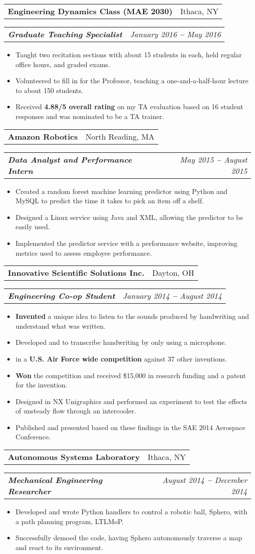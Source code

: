 \documentclass[letterpaper,11pt]{article}
\makeatletter
\def\vspaceAfterBullets{3pt} %
\def\bulletIndent{15pt} %
\newcommand{\bulletItem}[1]{
  \item\small{
    {#1}
  }
}
\newcommand{\companyNameAndLocationHeading}[2]{
  \item 
    \begin{tabular*}{1.0\textwidth}[b]{l@{\extracolsep{\fill}}r}
      \textbf{#1} & #2
    \end{tabular*}
}
\newcommand{\titleAndDateHeading}[2]{
    \item
    \begin{tabular*}{1.0\textwidth}[b]{l@{\extracolsep{\fill}}r}
      \textit{\textbf{\small#1}} & \textit{\small #2}
    \end{tabular*}
}
\newcommand{\outerBulletListStart}{\begin{itemize}[leftmargin=\bulletIndent]}
\newcommand{\outerBulletListEnd}{\end{itemize}\vspace{\vspaceAfterBullets}}
\newcommand{\bref}[2]{\href{#1}{\color{blue}{#2}}}
\makeatother
\begin{document}
\companyNameAndLocationHeading
{Engineering Dynamics Class (MAE 2030)}{Ithaca, NY}
\titleAndDateHeading
{Graduate Teaching Specialist}{January 2016 \textbf{--} May 2016}
\outerBulletListStart
\bulletItem{Taught two recitation sections with about 15 students in each, held regular office hours, and graded exams.}
\bulletItem{Volunteered to fill in for the Professor, teaching a one-and-a-half-hour lecture to about 150 students.}
\bulletItem{Received \textbf{4.88/5 overall rating} on my TA evaluation based on 16 student responses and was nominated to be a TA trainer.}
\outerBulletListEnd

\companyNameAndLocationHeading
{Amazon Robotics}{North Reading, MA}
\titleAndDateHeading
{Data Analyst and Performance Intern}{May 2015 \textbf{--} August 2015}
\outerBulletListStart
\bulletItem{Created a random forest machine learning predictor using Python and MySQL to predict the time it takes to pick an item off a shelf.}
\bulletItem{Designed a Linux service using Java and XML, allowing the predictor to be easily used.}
\bulletItem{Implemented the predictor service with a performance website, improving metrics used to assess employee performance.}
\outerBulletListEnd

\companyNameAndLocationHeading
{Innovative Scientific Solutions Inc.}{Dayton, OH}
\titleAndDateHeading
{Engineering Co-op Student}{January 2014 \textbf{--} August 2014}
\outerBulletListStart
\bulletItem{\textbf{Invented} a unique idea to listen to the sounds produced by handwriting and understand what was written.}
\bulletItem{Developed and \bref{https://github.com/jam643/WriteHear/tree/master}{coded a MATLAB program} to transcribe handwriting by only using a microphone.}
\bulletItem{\bref{https://github.com/jam643/WriteHear/blob/master/WriteHear.pdf}{Presented my invention} in a \textbf{U.S. Air Force wide competition} against 37 other inventions.}
\bulletItem{\textbf{Won} the competition and received \$15,000 in research funding and a patent for the invention.}
\bulletItem{Designed in NX Unigraphics and performed an experiment to test the effects of unsteady flow through an intercooler.}
\bulletItem{Published and presented \bref{https://www.researchgate.net/publication/290192705_Effect_of_Unsteady_Flow_on_Intercooler_Performance}{a conference paper} based on these findings in the SAE 2014 Aerospace Conference.}
\outerBulletListEnd

\companyNameAndLocationHeading
{Autonomous Systems Laboratory}{Ithaca, NY}
\titleAndDateHeading
{Mechanical Engineering Researcher}{August 2014 \textbf{--} December 2014}
\outerBulletListStart
\bulletItem{Developed and wrote Python handlers to control a robotic ball, Sphero, with a path planning program, LTLMoP.}
\bulletItem{Successfully demoed the code, having Sphero autonomously traverse a map and react to its environment.}
\outerBulletListEnd
\end{document}
